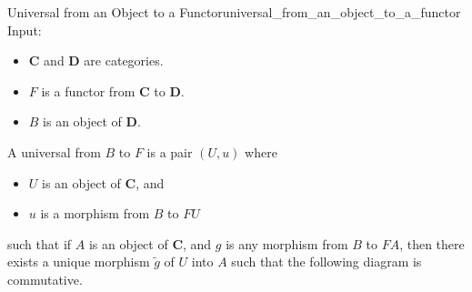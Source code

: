 \documentclass{article}
\begin{document}
\begin{definition}{Universal from an Object to a Functor}{universal_from_an_object_to_a_functor}
    Input:
    \begin{itemize}
        \item $\mathbf{C}$ and $\mathbf{D}$ are categories.
        \item $F$ is a functor from $\mathbf{C}$ to $\mathbf{D}$.
        \item $B$ is an object of $\mathbf{D}$.
    \end{itemize}
    A universal from $B$ to $F$ is a pair $(U,u)$ where
    \begin{itemize}
        \item $U$ is an object of $\mathbf{C}$, and
        \item $u$ is a morphism from $B$ to $FU$
    \end{itemize}
    such that if $A$ is an object of $\mathbf{C}$,
    and $g$ is any morphism from $B$ to $FA$,
    then there exists a unique morphism $\tilde{g}$ of $U$ into $A$
    such that the following diagram is commutative.
    \begin{center}
    \end{center}
\end{definition}
\end{document}
